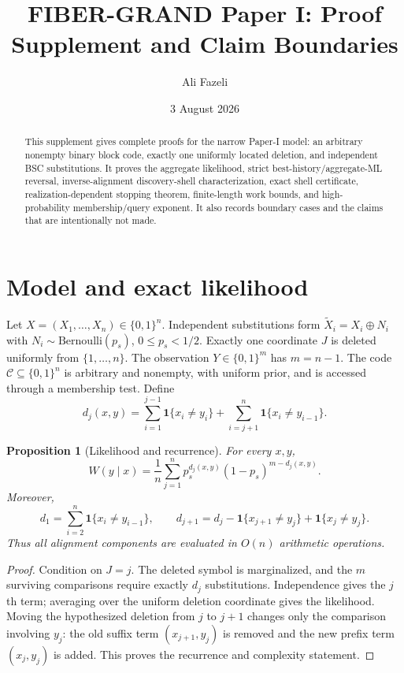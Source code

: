 \documentclass[11pt]{article}
\title{FIBER-GRAND Paper I: Proof Supplement and Claim Boundaries}
\author{Ali Fazeli}
\date{3 August 2026}
\newtheorem{proposition}[theorem]{Proposition}
\theoremstyle{remark}\newtheorem{remark}[theorem]{Remark}
\newcommand{\C}{\mathcal C}\newcommand{\I}{\mathcal I}\newcommand{\one}{\mathbf 1}
\begin{document}
\maketitle
\begin{abstract}
This supplement gives complete proofs for the narrow Paper-I model: an arbitrary nonempty binary
block code, exactly one uniformly located deletion, and independent BSC substitutions. It proves the
aggregate likelihood, strict best-history/aggregate-ML reversal, inverse-alignment discovery-shell
characterization, exact shell certificate, realization-dependent stopping theorem, finite-length
work bounds, and high-probability membership/query exponent. It also records boundary cases and the
claims that are intentionally not made.
\end{abstract}

\section{Model and exact likelihood}
Let $X=(X_1,\ldots,X_n)\in\{0,1\}^n$. Independent substitutions form
$\widetilde X_i=X_i\oplus N_i$ with $N_i\sim\mathrm{Bernoulli}(p_s)$, $0\le p_s<1/2$.
Exactly one coordinate $J$ is deleted uniformly from $\{1,\ldots,n\}$. The observation
$Y\in\{0,1\}^{m}$ has $m=n-1$. The code $\C\subseteq\{0,1\}^n$ is arbitrary and nonempty,
with uniform prior, and is accessed through a membership test. Define
\[
 d_j(x,y)=\sum_{i=1}^{j-1}\one\{x_i\ne y_i\}+
 \sum_{i=j+1}^{n}\one\{x_i\ne y_{i-1}\}.
\]
\begin{proposition}[Likelihood and recurrence]\label{prop:like}
For every $x,y$,
\[
 W(y\mid x)=\frac1n\sum_{j=1}^{n}p_s^{d_j(x,y)}(1-p_s)^{m-d_j(x,y)}.
\]
Moreover,
\[
 d_1=\sum_{i=2}^{n}\one\{x_i\ne y_{i-1}\},\qquad
 d_{j+1}=d_j-\one\{x_{j+1}\ne y_j\}+\one\{x_j\ne y_j\}.
\]
Thus all alignment components are evaluated in $O(n)$ arithmetic operations.
\end{proposition}
\begin{proof}
Condition on $J=j$. The deleted symbol is marginalized, and the $m$ surviving comparisons require
exactly $d_j$ substitutions. Independence gives the $j$th term; averaging over the uniform deletion
coordinate gives the likelihood. Moving the hypothesized deletion from $j$ to $j+1$ changes only
the comparison involving $y_j$: the old suffix term $(x_{j+1},y_j)$ is removed and the new prefix
term $(x_j,y_j)$ is added. This proves the recurrence and complexity statement.
\end{proof}
\end{document}

